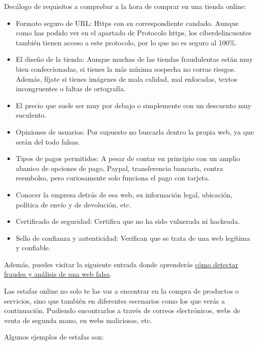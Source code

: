 \documentclass[
  a4paper,
  openany]{book}
\begin{document}
Decálogo de requisitos a comprobar a la hora de comprar en una tienda online:

\begin{itemize}
\item
  Formato seguro de URL: Https con su correspondiente candado. Aunque como has podido ver en el apartado de Protocolo https, los ciberdelincuentes también tienen acceso a este protocolo, por lo que no es seguro al 100\%.
\item
  El diseño de la tienda: Aunque muchas de las tiendas fraudulentas están muy bien confeccionadas, si tienes la más mínima sospecha no corras riesgos. Además, fíjate si tienes imágenes de mala calidad, mal enfocadas, textos incongruentes o faltas de ortografía.
\item
  El precio que suele ser muy por debajo o simplemente con un descuento muy suculento.
\item
  Opiniones de usuarios: Por supuesto no buscarla dentro la propia web, ya que serán del todo falsas.
\item
  Tipos de pagos permitidos: A pesar de contar en principio con un amplio abanico de opciones de pago, Paypal, transferencia bancaria, contra reembolso, pero curiosamente solo funciona el pago con tarjeta.
\item
  Conocer la empresa detrás de esa web, su información legal, ubicación, política de envío y de devolución, etc.
\item
  Certificado de seguridad: Certifica que no ha sido vulnerada ni hackeada.
\item
  Sello de confianza y autenticidad: Verifican que se trata de una web legítima y confiable.
\end{itemize}

Además, puedes visitar la siguiente entrada donde aprenderás \href{https://www.osi.es/es/actualidad/blog/2018/08/08/detectando-fraudes-analisis-de-una-web-de-venta-falsa}{cómo detectar fraudes y análisis de una web falsa}.

Las estafas online no solo te las vas a encontrar en la compra de productos o servicios, sino que también en diferentes escenarios como los que verás a continuación. Pudiendo encontrarlos a través de correos electrónicos, webs de venta de segunda mano, en webs maliciosas, etc.

Algunos ejemplos de estafas son:
\end{document}
